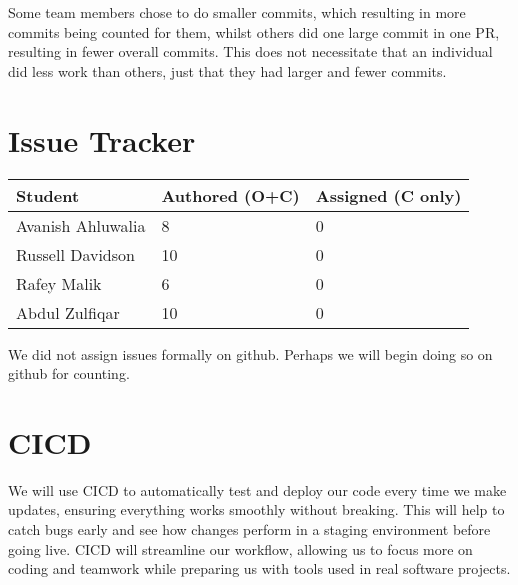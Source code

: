 \documentclass{article}
\begin{document}
Some team members chose to do smaller commits, which resulting in more commits being counted for them, whilst others did one large commit in one PR, resulting in fewer overall commits. This does not necessitate that an individual did less work than others, just that they had larger and fewer commits.

\section{Issue Tracker}

\begin{table}[H]
\centering
\begin{tabular}{lll}
\toprule
\textbf{Student} & \textbf{Authored (O+C)} & \textbf{Assigned (C only)}\\
\midrule
Avanish Ahluwalia & 8 & 0\\
Russell Davidson & 10 & 0\\
Rafey Malik & 6 & 0\\
Abdul Zulfiqar & 10 & 0\\
\bottomrule
\end{tabular}
\end{table}

We did not assign issues formally on github. Perhaps we will begin doing so on github for counting.

\section{CICD}

We will use CICD to automatically test and deploy our code every time we make updates, ensuring everything works smoothly without breaking. This will help to catch bugs early and see how changes perform in a staging environment before going live. CICD will streamline our workflow, allowing us to focus more on coding and teamwork while preparing us with tools used in real software projects.
\end{document}
